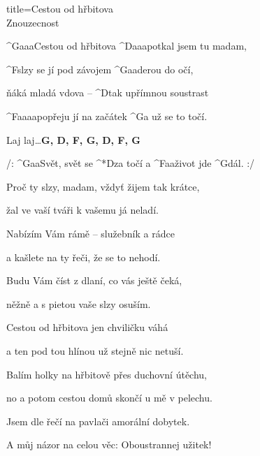 \begin{song}{title=\predtitle\centering Cestou od hřbitova \\\large Znouzecnost  \vspace*{-0.3cm}}  %
\begin{centerjustified}
\nejnejvetsi

\sloka
	^{G{\color{white}aaa}}Cestou od hřbitova ^{D{\color{white}aaa}}potkal jsem tu madam,
	
	^{F}slzy se jí pod závojem ^{G{\color{white}aa}}derou do očí,
	
	ňáká mladá vdova -- ^{D}tak upřímnou soustrast
	
	^{F{\color{white}aaaa}}popřeju jí na začátek ^{G}a už se to točí.
	
	Laj laj\elipsa\dots \textbf{G, D, F, G, D, F, G}

	/: ^{G{\color{white}aa}}Svět, svět se ^*{D}za točí a ^{F{\color{white}aa}}život jde ^{G}dál. :/ %

\sloka
	Proč ty slzy, madam, vždyť žijem tak krátce,
	
	žal ve vaší tváři k vašemu já neladí.
	
	Nabízím Vám rámě -- služebník a rádce
	
	a kašlete na ty řeči, že se to nehodí.


\sloka
	Budu Vám číst z dlaní, co vás ještě čeká,
	
	něžně a s pietou vaše slzy osuším.
	
	Cestou od hřbitova jen chviličku váhá
	
	a ten pod tou hlínou už stejně nic netuší.


\sloka
	Balím holky na hřbitově přes duchovní útěchu,
	
	no a potom cestou domů skončí u mě v pelechu.
	
	Jsem dle řečí na pavlači amorální dobytek.
	
	A můj názor na celou věc: Oboustrannej užitek!


\end{centerjustified}
\setcounter{Slokočet}{0}
\end{song}
